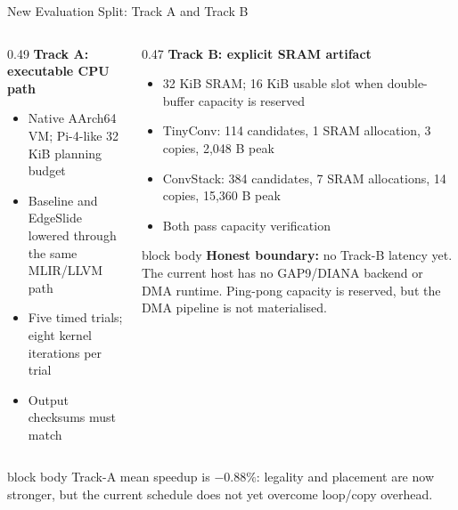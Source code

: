 \documentclass[10pt,aspectratio=169]{beamer}
\begin{document}
\begin{frame}{New Evaluation Split: Track A and Track B}
\begin{columns}[T,totalwidth=0.99\textwidth]
\begin{column}{0.49\textwidth}
\textbf{Track A: executable CPU path}
\begin{itemize}
\small
\item Native AArch64 VM; Pi-4-like 32 KiB planning budget
\item Baseline and EdgeSlide lowered through the same MLIR/LLVM path
\item Five timed trials; eight kernel iterations per trial
\item Output checksums must match
\end{itemize}

\vspace{0.15cm}
\centering
{}
\end{column}

\begin{column}{0.47\textwidth}
\textbf{Track B: explicit SRAM artifact}
\begin{itemize}
\small
\item 32 KiB SRAM; 16 KiB usable slot when double-buffer capacity is reserved
\item TinyConv: 114 candidates, 1 SRAM allocation, 3 copies, 2,048 B peak
\item ConvStack: 384 candidates, 7 SRAM allocations, 14 copies, 15,360 B peak
\item Both pass capacity verification
\end{itemize}

\vspace{0.15cm}
\begin{beamercolorbox}[sep=0.35em,center,rounded=true,shadow=true]{block body}
\small
\textbf{Honest boundary:} no Track-B latency yet. The current host has no
GAP9/DIANA backend or DMA runtime. Ping-pong capacity is reserved, but the
DMA pipeline is not materialised.
\end{beamercolorbox}
\end{column}
\end{columns}

\vspace{0.2cm}
\begin{beamercolorbox}[sep=0.3em,center,rounded=true,shadow=true]{block body}
\small
Track-A mean speedup is \textbf{$-0.88\%$}: legality and placement are now
stronger, but the current schedule does not yet overcome loop/copy overhead.
\end{beamercolorbox}
\end{frame}
\end{document}
